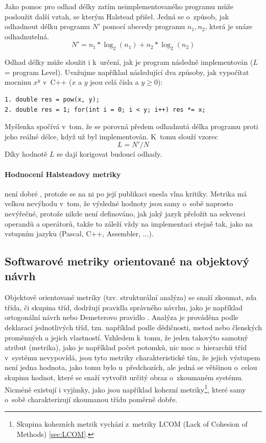 \documentclass[11pt,twoside,a4paper]{book}
\begin{document}
Jako pomoc pro odhad délky zatím neimplementovaného programu může posloužit další vztah, se kterým Halstead přišel.
Jedná se o~způsob, jak odhadnout délku programu $N'$ pomocí abecedy programu $n_1, n_2$, která je snáze odhadnutelná.
$$N' = n_1 * \log_2{(n_1)} + n_2 * \log_2{(n_2)}$$

Odhad délky může sloužit i k~určení, jak  je program následně implementován ($L$ = program Level). Uvažujme například následující dva způsoby,
jak vypočítat mocninu $x^y$ v~C++ ($x$ a $y$ jsou celá čísla a $y \geq 0$):
\begin{verbatim}
1. double res = pow(x, y);
2. double res = 1; for(int i = 0; i < y; i++) res *= x;
\end{verbatim}

Myšlenka spočívá v~tom, že se porovná předem odhadnutá délka programu proti jeho reálné délce, když už byl implementován. 
K~tomu slouží vzorec
$$L = N' / N$$
Díky hodnotě $L$ se dají korigovat budoucí odhady.

\paragraph{Hodnocení Halsteadovy metriky} není dobré \cite{MARCO97,CMM}, protože se na ni po její publikaci snesla vlna kritiky.
Metrika má velkou nevýhodu v~tom, že výsledné hodnoty jsou samy o~sobě naprosto nevýřečné, protože nikde není definováno,
jak jaký jazyk přeložit na sekvenci operandů a operátorů, takže to záleží vždy na implementaci stejně tak, jako na vstupním
jazyku (Pascal, C++, Assembler, ...).

\subsection{Softwarové metriky orientované na objektový návrh}
Objektově orientované metriky (tzv. strukturální analýza) se snaží zkoumat, zda třída,
či skupina tříd, dodržují pravidla správného návrhu, jako je například ortogonální návrh \cite{Pragmatik}
nebo Demeterovo pravidlo \cite{Pragmatik}. Analýza je prováděna podle deklarací jednotlivých tříd,
tzn. například podle dědičnosti, metod nebo členských proměnných a jejich vlastností.
Vzhledem k~tomu, že jeden takovýto samotný atribut (metrika), jako je například počet
potomků, nic moc o~hierarchii tříd v~systému nevypovídá, jsou tyto metriky charakteristické tím, že jejich výstupem
není jedna hodnota, jako tomu bylo u~předchozích, ale jedná se většinou o~celou skupinu hodnot, které se
snaží vytvořit určitý obraz o~zkoumaném systému. Nicméně existují i vyjímky, jako jsou například
{kohezní metriky}\footnote{Skupina kohezních metrik vychází z~metriky LCOM (Lack of Cohesion of Methods) \ref{sec:LCOM}.},
které samy o~sobě charakterizují zkoumanou třídu poměrně dobře.
\end{document}
